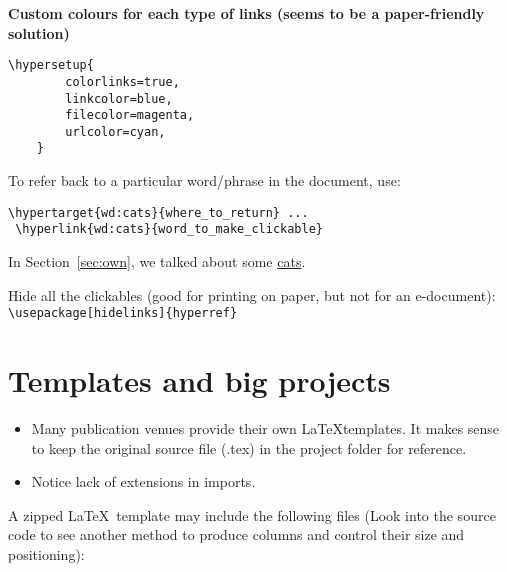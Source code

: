 \documentclass[a4paper,11pt]{article}
\begin{document}
\textbf{Custom colours for each type of links (seems to be a paper-friendly solution)}

\begin{lstlisting}[breaklines]
	\hypersetup{
		colorlinks=true,
		linkcolor=blue,
		filecolor=magenta,      
		urlcolor=cyan,
	}
\end{lstlisting}

To refer back to a particular word/phrase in the document, use: 
\begin{lstlisting}[breaklines]
\hypertarget{wd:cats}{where_to_return} ...
 \hyperlink{wd:cats}{word_to_make_clickable}
\end{lstlisting}

\thispagestyle{empty}\label{pg:empty}

In Section~\ref{sec:own}, we talked about some \hyperlink{wd:random}{cats}.

\bigskip

Hide all the clickables (good for printing on paper, but not for an e-document): \\
\verb|\usepackage[hidelinks]{hyperref}|

\section{Templates and big projects}
\begin{itemize}
	\item Many publication venues provide their own \LaTeX templates. It makes sense to keep the original source file (.tex) in the project folder for reference. 
	\item Notice lack of extensions in imports.
\end{itemize}

A zipped \LaTeX~template may include the following files (Look into the source code to see another method to produce columns and control their size and positioning):

\medskip
\end{document}
